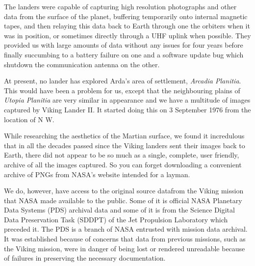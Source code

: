 The landers were capable of capturing high resolution photographs and other data from the surface of the planet, buffering temporarily onto internal magnetic tapes, and then relaying this data back to Earth through one the orbiters when it was in position, or sometimes directly through a UHF uplink when possible. They provided us with large amounts of data without any issues for four years before finally succumbing to a battery failure on one and a software update bug which shutdown the communication antenna on the other.

At present, no lander has explored Arda's area of settlement, {\it Arcadia Planitia}. This would have been a problem for us, except that the neighbouring plains of {\it Utopia Planitia} are very similar in appearance and we have a multitude of images captured by Viking Lander II. It started doing this on 3 September 1976 from the location of N W.

    {}

\page
{}

While researching the aesthetics of the Martian surface, we found it incredulous that in all the decades passed since the Viking landers sent their images back to Earth, there did not appear to be so much as a single, complete, user friendly, archive of all the images captured. So you can forget downloading a convenient archive of PNGs from NASA's website intended for a layman.\footnotecite[grayzeck2008]

We do, however, have access to the original source data from the Viking mission that NASA made available to the public. Some of it is official NASA Planetary Data Systems (PDS) archival data and some of it is from the Science Digital Data Preservation Task (SDDPT) of the Jet Propulsion Laboratory which preceded it. The PDS is a branch of NASA entrusted with mission data archival. It was established because of concerns that data from previous missions, such as the Viking mission, were in danger of being lost or rendered unreadable because of failures in preserving the necessary documentation.
    {}

